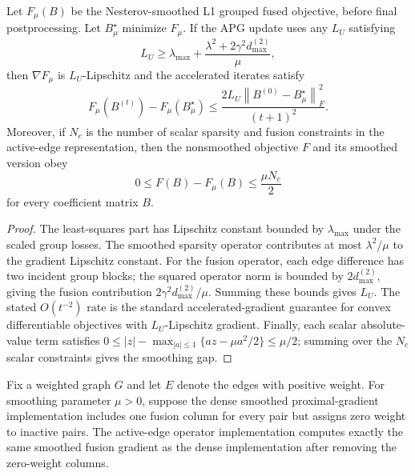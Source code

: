 \documentclass[twoside,11pt]{article}
\newcommand{\norm}[1]{\left\lVert #1 \right\rVert}
\begin{document}
\begin{proposition}
\label{prop:l1-convergence}
\leavevmode\par\noindent
Let $F_\mu(B)$ be the Nesterov-smoothed L1 grouped fused objective, before
final postprocessing. Let $B_\mu^\star$ minimize $F_\mu$. If the APG update
uses any $L_U$ satisfying
\[
  L_U \geq
  \lambda_{\max}
  + \frac{\lambda^2+2\gamma^2 d_{\max}^{(2)}}{\mu},
\]
then $\nabla F_\mu$ is $L_U$-Lipschitz and the accelerated iterates satisfy
\[
  F_\mu(B^{(t)})-F_\mu(B_\mu^\star)
  \leq
  \frac{2L_U\norm{B^{(0)}-B_\mu^\star}_F^2}{(t+1)^2}.
\]
Moreover, if $N_c$ is the number of scalar sparsity and fusion constraints in
the active-edge representation, then the nonsmoothed objective $F$ and its
smoothed version obey
\[
  0 \leq F(B)-F_\mu(B) \leq \frac{\mu N_c}{2}
\]
for every coefficient matrix $B$.
\end{proposition}

\begin{proof}
The least-squares part has Lipschitz constant bounded by
$\lambda_{\max}$ under the scaled group losses. The smoothed sparsity
operator contributes at most $\lambda^2/\mu$ to the gradient Lipschitz
constant. For the fusion operator, each edge difference has two incident
group blocks; the squared operator norm is bounded by
$2d_{\max}^{(2)}$, giving the fusion contribution
$2\gamma^2 d_{\max}^{(2)}/\mu$. Summing these bounds gives $L_U$. The stated
$O(t^{-2})$ rate is the standard accelerated-gradient guarantee for convex
differentiable objectives with $L_U$-Lipschitz gradient. Finally, each scalar
absolute-value term satisfies
$0\leq |z|-\max_{|a|\leq 1}\{az-\mu a^2/2\}\leq\mu/2$; summing over the
$N_c$ scalar constraints gives the smoothing gap.
\end{proof}

\begin{proposition}
\label{prop:l1-equivalence}
\leavevmode\par\noindent
Fix a weighted graph $G$ and let $E$ denote the edges with positive weight.
For smoothing parameter $\mu>0$, suppose the dense smoothed proximal-gradient
implementation includes one fusion column for every pair but assigns zero
weight to inactive pairs. The active-edge operator implementation computes
exactly the same smoothed fusion gradient as the dense implementation after
removing the zero-weight columns.
\end{proposition}
\end{document}
